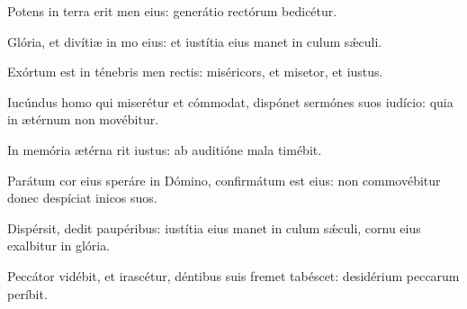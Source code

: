 \item {}

\item Potens in terra erit men eius:\psstar{} generátio rectórum bedicétur.

\item Glória, et divítiæ in mo eius:\psstar{} et iustítia eius manet in culum sǽculi.

\item Exórtum est in ténebris men rectis:\psstar{} miséricors, et misetor, et iustus.

\item Iucúndus homo qui miserétur et cómmodat,\pscross{} dispónet sermónes suos  iudício:\psstar{} quia in ætérnum non movébitur.

\item In memória ætérna rit iustus:\psstar{} ab auditióne mala  timébit.

\item Parátum cor eius speráre in Dómino,\pscross{} confirmátum est  eius:\psstar{} non commovébitur donec despíciat inicos suos.

\item Dispérsit, dedit paupéribus:\pscross{} iustítia eius manet in culum sǽculi,\psstar{} cornu eius exalbitur in glória.

\item Peccátor vidébit, et irascétur,\pscross{} déntibus suis fremet  tabéscet:\psstar{} desidérium peccarum períbit.